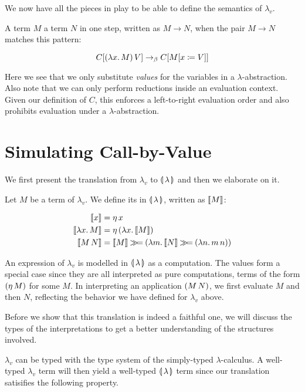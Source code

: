 We now have all the pieces in play to be able to define the semantics of
$\lambda_v$.

\begin{definition}
  A term $M$  a term $N$ in one step, written as $M \to
  N$, when the pair $M \to N$ matches this pattern:

$$
C[(\lambda x.\, M)\,V] \to_\beta C[M[x \coloneqq V]]
$$
\end{definition}

Here we see that we only substitute \emph{values} for the variables in a
$\lambda$-abstraction. Also note that we can only perform reductions inside
an evaluation context. Given our definition of $C$, this enforces a
left-to-right evaluation order and also prohibits evaluation under a
$\lambda$-abstraction.


\section{Simulating Call-by-Value}
\label{sec:simulating-cbv}

We first present the translation from $\lambda_v$ to $\llparenthesis \, \lambda \, \rrparenthesis$ and
then we elaborate on it.

\begin{definition}
  Let $M$ be a term of $\lambda_v$. We define its  in
  $\llparenthesis \, \lambda \, \rrparenthesis$, written as $\llbracket M \rrbracket$:

\begin{align*}
  \llbracket x \rrbracket &= \eta\,x \\
  \llbracket \lambda x.\, M \rrbracket &= \eta\,(\lambda x.\, \llbracket M \rrbracket) \\
  \llbracket M\,N \rrbracket &= \llbracket M \rrbracket \mathbin{\gg\!=} (\lambda m.\, \llbracket N \rrbracket \mathbin{\gg\!=} (\lambda n.\, m\,n))
\end{align*}
\end{definition}

An expression of $\lambda_v$ is modelled in $\llparenthesis \, \lambda \, \rrparenthesis$ as a
computation. The values form a special case since they are all interpreted
as pure computations, terms of the form $(\eta\,M)$ for some $M$. In
interpreting an application $(M\,N)$, we first evaluate $M$ and then
$N$, reflecting the behavior we have defined for $\lambda_v$ above.

Before we show that this translation is indeed a faithful one, we will
discuss the types of the interpretations to get a better understanding of
the structures involved.

$\lambda_v$ can be typed with the type system of the simply-typed
$\lambda$-calculus. A well-typed $\lambda_v$ term will then yield a
well-typed $\llparenthesis \, \lambda \, \rrparenthesis$ term since our translation satisifies the
following property. 

